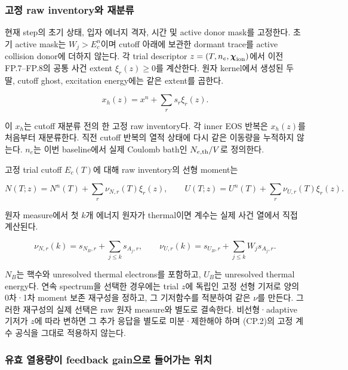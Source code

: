 \hypertarget{uxace0uxc815-raw-inventoryuxc640-uxc7acuxbd84uxb958}{%
\subsubsection{고정 raw inventory와 재분류}\label{uxace0uxc815-raw-inventoryuxc640-uxc7acuxbd84uxb958}}

현재 step의 초기 상태, 입자 에너지 격자, 시간 및 active donor mask를 고정한다. 초기 active mask는 \(W_j>E_c^n\)이며 cutoff 아래에 보관한 dormant trace를 active collision donor에 더하지 않는다. 각 trial descriptor \(z=(T,n_e,\boldsymbol\chi_{\rm ion})\)에서 이전 FP.7--FP.8의 공통 사건 extent \(\xi_r(z)\ge0\)를 계산한다. 원자 kernel에서 생성된 두 딸, cutoff ghost, excitation energy에는 같은 extent를 곱한다.

\[
x_h(z)=x^n+\sum_rs_r\xi_r(z).
\tag{CP.1}
\]

이 \(x_h\)는 cutoff 재분류 전의 한 고정 raw inventory다. 각 inner EOS 반복은 \(x_h(z)\)를 처음부터 재분류한다. 직전 cutoff 반복의 열적 상태에 다시 같은 이동량을 누적하지 않는다. \(n_e\)는 이번 baseline에서 실제 Coulomb bath인 \(N_{e,\rm th}/V\)로 정의한다.

고정 trial cutoff \(E_c(T)\)에 대해 raw inventory의 선형 moment는

\[
N(T;z)=N^n(T)+\sum_r\nu_{N,r}(T)\xi_r(z),\qquad
U(T;z)=U^n(T)+\sum_r\nu_{U,r}(T)\xi_r(z).
\tag{CP.2}
\]

원자 measure에서 첫 \(k\)개 에너지 원자가 thermal이면 계수는 실제 사건 열에서 직접 계산된다.

\[
\nu_{N,r}(k)=s_{N_B,r}+\sum_{j\le k}s_{A_j,r},\qquad
\nu_{U,r}(k)=s_{U_B,r}+\sum_{j\le k}W_js_{A_j,r}.
\tag{CP.3}
\]

\(N_B\)는 핵수와 unresolved thermal electrons를 포함하고, \(U_B\)는 unresolved thermal energy다. 연속 spectrum을 선택한 경우에는 trial \(z\)에 독립인 고정 선형 기저로 양의 0차·1차 moment 보존 재구성을 정하고, 그 기저함수를 적분하여 같은 \(\nu\)를 만든다. 그러한 재구성의 실제 선택은 raw 원자 measure와 별도로 결속한다. 비선형·adaptive 기저가 \(z\)에 따라 변하면 그 추가 응답을 별도로 미분·제한해야 하며 (CP.2)의 고정 계수 공식을 그대로 적용하지 않는다.

\hypertarget{uxc720uxd6a8-uxc5f4uxc6a9uxb7c9uxc774-feedback-gainuxc73cuxb85c-uxb4e4uxc5b4uxac00uxb294-uxc704uxce58}{%
\subsubsection{유효 열용량이 feedback gain으로 들어가는 위치}\label{uxc720uxd6a8-uxc5f4uxc6a9uxb7c9uxc774-feedback-gainuxc73cuxb85c-uxb4e4uxc5b4uxac00uxb294-uxc704uxce58}}

